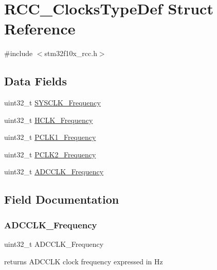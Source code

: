 \hypertarget{struct_r_c_c___clocks_type_def}{}\section{R\+C\+C\+\_\+\+Clocks\+Type\+Def Struct Reference}
\label{struct_r_c_c___clocks_type_def}


{\ttfamily \#include $<$stm32f10x\+\_\+rcc.\+h$>$}

\subsection*{Data Fields}
\begin{DoxyCompactItemize}
\item 
uint32\+\_\+t \mbox{\hyperlink{struct_r_c_c___clocks_type_def_a48b5f04759728e39921969e75c4899e8}{S\+Y\+S\+C\+L\+K\+\_\+\+Frequency}}
\item 
uint32\+\_\+t \mbox{\hyperlink{struct_r_c_c___clocks_type_def_a5f9bf60f522a160aa7a878acf92ce129}{H\+C\+L\+K\+\_\+\+Frequency}}
\item 
uint32\+\_\+t \mbox{\hyperlink{struct_r_c_c___clocks_type_def_a9045b24904bde572d479e85c6d2801f6}{P\+C\+L\+K1\+\_\+\+Frequency}}
\item 
uint32\+\_\+t \mbox{\hyperlink{struct_r_c_c___clocks_type_def_a45ada83b2d388a60ed994451f260f389}{P\+C\+L\+K2\+\_\+\+Frequency}}
\item 
uint32\+\_\+t \mbox{\hyperlink{struct_r_c_c___clocks_type_def_a6c69aa8122e38438fe171609e9422e87}{A\+D\+C\+C\+L\+K\+\_\+\+Frequency}}
\end{DoxyCompactItemize}


\subsection{Field Documentation}
\mbox{\label{struct_r_c_c___clocks_type_def_a6c69aa8122e38438fe171609e9422e87}} 
\subsubsection{\texorpdfstring{ADCCLK\_Frequency}{ADCCLK\_Frequency}}
{\footnotesize\ttfamily uint32\+\_\+t A\+D\+C\+C\+L\+K\+\_\+\+Frequency}

returns A\+D\+C\+C\+LK clock frequency expressed in Hz \mbox{\label{struct_r_c_c___clocks_type_def_a5f9bf60f522a160aa7a878acf92ce129}} 
